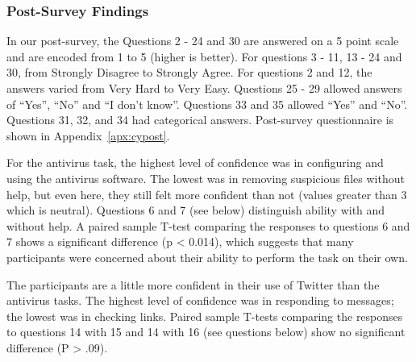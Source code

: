 \documentclass[doctor]{thesis} %
\theoremstyle{plain}
\begin{document}
\subsubsection*{Post-Survey Findings}
In our post-survey, the Questions 2 - 24 and 30 are answered on a 5 point scale and are encoded from 1 to 5 (higher is better). For questions 3 - 11, 13 - 24 and 30, from Strongly Disagree to Strongly Agree. For questions 2 and 12, the answers varied from Very Hard to Very Easy. Questions 25 - 29 allowed answers of ``Yes'', ``No'' and ``I don't know''. Questions 33 and 35 allowed ``Yes'' and ``No''. Questions 31, 32, and 34 had categorical answers. Post-survey questionnaire is shown in Appendix~\ref{apx:cypost}.


For the antivirus task, the highest level of confidence was in configuring and using the antivirus software. The lowest was in removing suspicious files without help, but even here, they still felt more confident than not (values greater than 3 which is neutral). Questions 6 and 7 (see below) distinguish ability with and without help. A paired sample T-test comparing the responses to questions 6 and 7 shows a significant difference (p < 0.014), which suggests that many participants were concerned about their ability to perform the task on their own. 

\noindent{}

The participants are a little more confident in their use of Twitter than the antivirus tasks. The highest level of confidence was in responding to messages; the lowest was in checking links. Paired sample T-tests comparing the responses to questions 14 with 15 and 14 with 16 (see questions below) show no significant difference (P > .09).

\noindent{}
\end{document}
